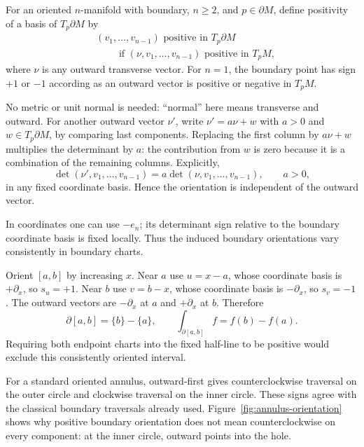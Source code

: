 \begin{definition}
For an oriented $n$-manifold with boundary, $n\geq2$, and $p\in\partial M$,
define positivity of a basis of $T_p\partial M$ by
\[
\begin{aligned}
&(v_1,\ldots,v_{n-1})\text{ positive in }T_p\partial M\\
&\qquad\text{ if }
\boxed{(\nu,v_1,\ldots,v_{n-1})\text{ positive in }T_pM,}
\end{aligned}
\]
where $\nu$ is any outward transverse vector. For $n=1$, the boundary
point has sign $+1$ or $-1$ according as an outward vector is positive
or negative in $T_pM$.
\end{definition}
No metric or unit normal is needed: ``normal'' here means transverse and
outward. For another outward vector $\nu'$, write
$\nu'=a\nu+w$ with $a>0$ and $w\in T_p\partial M$, by comparing
last components. Replacing the first column by $a\nu+w$ multiplies
the determinant by $a$: the contribution from $w$ is zero because it is
a combination of the remaining columns. Explicitly,
\[
\det(\nu',v_1,\ldots,v_{n-1})
=a\det(\nu,v_1,\ldots,v_{n-1}),\qquad a>0,
\]
in any fixed coordinate basis. Hence the orientation is independent of
the outward vector.

In coordinates one can use $-e_n$; its determinant
sign relative to the boundary coordinate basis is fixed locally. Thus
the induced boundary orientations vary consistently in boundary charts.

\begin{example}
Orient $[a,b]$ by increasing $x$. Near $a$ use $u=x-a$, whose coordinate
basis is $+\partial_x$, so $s_u=+1$. Near $b$ use $v=b-x$, whose
coordinate basis is $-\partial_x$, so $s_v=-1$. The outward vectors
are $-\partial_x$ at $a$ and $+\partial_x$ at $b$. Therefore
\[
\partial[a,b]=\{b\}-\{a\},\qquad
\int_{\partial[a,b]}f=f(b)-f(a).
\]
Requiring both endpoint charts into the fixed half-line to be positive
would exclude this consistently oriented interval.
\end{example}
For a standard oriented annulus, outward-first gives counterclockwise
traversal on the outer circle and clockwise traversal on the inner circle.
These signs agree with the classical boundary traversals already used.
Figure~\ref{fig:annulus-orientation} shows why positive boundary orientation
does not mean counterclockwise on every component: at the inner circle,
outward points into the hole.

\FloatBarrier


